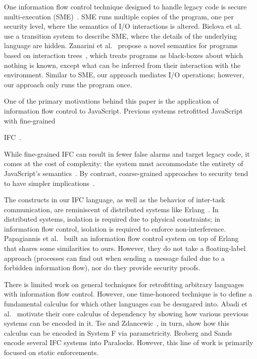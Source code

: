 \documentclass{llncs}
\newif\ifextended
\begin{document}
One information flow control technique designed to handle legacy code is
secure multi-execution (SME)~\cite{Devriese:2010,Rafnson:2013}. SME runs
multiple copies of the program, one per security level, where the semantics of
I/O interactions is altered.
Bielova et
al.~\cite{Biel-etal-11-TR} use a transition system to describe SME, where the
details of the underlying language are hidden.  Zanarini et
al.~\cite{ZanariniJR13} propose a novel semantics for programs based on
interaction trees~\cite{jacobs-tutorial}, which treats programs as black-boxes
about which nothing is known, except what can be inferred from their interaction
with the environment. Similar to SME, our approach mediates I/O
operations; however, our approach only runs the program once.


One of the primary motivations behind this paper is the application of
information flow control to JavaScript.  Previous systems 
retrofitted JavaScript with fine-grained
\ifextended
IFC~\cite{Hedin:2012,ConDOM,JSFlow}.
\else
IFC~\cite{Hedin:2012,JSFlow}.
\fi
While fine-grained IFC can result
in fewer false alarms and target legacy code, it comes at the
cost of complexity: the system must accommodate the entirety of JavaScript's
semantics~\cite{JSFlow}.
By contrast, coarse-grained
approaches to security
tend to have simpler implications~\cite{Yip:2009:PBS,DeGroef:2012}.





The constructs in our IFC language, as well as the behavior of
inter-task communication, are reminiscent of distributed systems like
Erlang~\cite{Armstrong03makingreliable}.
In distributed systems, isolation is required due to
physical constraints; in information flow control, isolation is
required to enforce non-interference.  Papagiannis et
al.~\cite{Papagiannis_enforcinguser} built an information flow control
system on top of Erlang that shares some similarities to ours.
However, they do not take a floating-label approach (processes can find
out when sending a message failed due to a forbidden information
flow), nor do they provide security proofs.

There is limited work on general techniques for retrofitting
arbitrary languages with information flow control. However, one time-honored
technique is to define a fundamental calculus for which other languages can be
desugared into.  Abadi et al.~\cite{abadi+:core} motivate their core calculus of
dependency by showing how various previous systems can be encoded in it. Tse and
Zdancewic~\cite{Tse:Zdancewic:ICFP04}, in turn, show how this calculus can be
encoded in System F via parametricity.  Broberg and Sands~\cite{Broberg:2010}
encode several IFC systems into Paralocks.  However, this line of work is
primarily focused on static enforcements.
\end{document}

